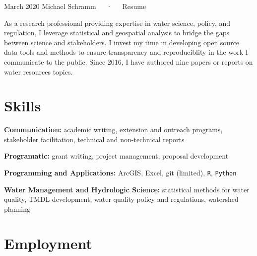 \documentclass[11pt, a4paper]{awesome-cv}
\newcounter{papers}
\begin{document}
\makecvheader

\makecvfooter
  {March 2020}
    {Michael Schramm~~~·~~~Resume}
  {\thepage}






As a research professional providing expertise in water science, policy, and regulation, I leverage statistical and geospatial analysis to bridge the gaps between science and stakeholders. I invest my time in developing open source data tools and methods to ensure transparency and reproduciblity in the work I communicate to the public. Since 2016, I have authored nine papers or reports on water resources topics.

\hypertarget{skills}{%
\section{Skills}\label{skills}}

\textbf{Communication:} academic writing, extension and outreach programs, stakeholder facilitation, technical and non-technical reports

\textbf{Programatic:} grant writing, project management, proposal development

\textbf{Programming and Applications:} ArcGIS, Excel, git (limited), \texttt{R}, \texttt{Python}

\textbf{Water Management and Hydrologic Science:} statistical methods for water quality, TMDL development, water quality policy and regulations, watershed planning

\hypertarget{employment}{%
\section{Employment}\label{employment}}
\end{document}
